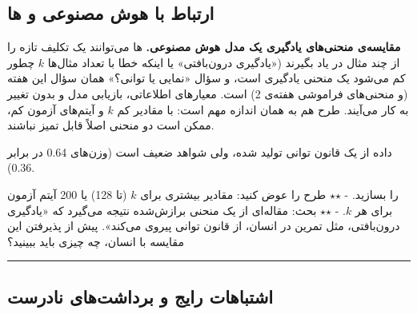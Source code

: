 \subsection{\texorpdfstring{ارتباط با هوش مصنوعی و
ها}{ارتباط با هوش مصنوعی و LLMها}}

\textbf{مقایسه‌ی منحنی‌های یادگیری یک مدل هوش مصنوعی.} ها می‌توانند
یک تکلیف تازه را از چند مثال در  یاد بگیرند («یادگیری
درون‌بافتی» یا  اینکه خطا با تعداد مثال‌ها \(k\)
چطور کم می‌شود یک منحنی یادگیری است، و سؤال «نمایی یا توانی؟» همان سؤال
 این هفته (و منحنی‌های فراموشی هفته‌ی 2) است. معیارهای اطلاعاتی،
بازیابی مدل و  بدون تغییر به کار می‌آیند. طرح هم به
همان اندازه مهم است: با مقادیر کم \(k\) و آیتم‌های آزمون کم، ممکن است دو
منحنی اصلاً قابل تمیز نباشند.

داده از یک قانون توانی تولید شده، ولی شواهد ضعیف است (وزن‌های 0.64 در
برابر 0.36).

 را بسازید. - \ensuremath{\star}\ensuremath{\star} طرح را عوض کنید: مقادیر بیشتری
برای \(k\) (تا 128) یا 200 آیتم آزمون برای هر \(k\). - \ensuremath{\star}\ensuremath{\star} بحث: مقاله‌ای
از یک منحنی برازش‌شده نتیجه می‌گیرد که «یادگیری درون‌بافتی، مثل تمرین در
انسان، از قانون توانی پیروی می‌کند». پیش از پذیرفتن این مقایسه با انسان،
چه چیزی باید ببینید؟

\begin{center}\rule{0.5\linewidth}{0.5pt}\end{center}

\subsection{اشتباهات رایج و برداشت‌های نادرست}

